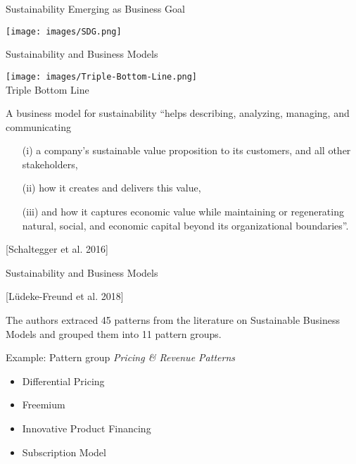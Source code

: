 \documentclass{beamer}
\begin{document}
\begin{frame}{Sustainability Emerging as Business Goal}

\begin{center}
    \texttt{[image: images/SDG.png]}
\end{center}
\end{frame}

\begin{frame}{Sustainability and Business Models}
\begin{center}
  \begin{minipage}{.4\textwidth}\centering
    \texttt{[image: images/Triple-Bottom-Line.png]}\\
    Triple Bottom Line
  \end{minipage}
  \begin{minipage}{.55\textwidth}
    A business model for sustainability “helps describing, analyzing,
    managing, and communicating
  \begin{itemize}
  \item[(i)] a company’s sustainable value proposition to its customers, and
    all other stakeholders,
  \item[(ii)] how it creates and delivers this value,
  \item[(iii)] and how it captures economic value while maintaining or
    regenerating natural, social, and economic capital beyond its
    organizational boundaries”.
  \end{itemize}
  [Schaltegger et al. 2016]
  \end{minipage}
\end{center}
\end{frame}

\begin{frame}{Sustainability and Business Models}

  [Lüdeke-Freund et al. 2018]
  
The authors extraced 45 patterns from the literature on Sustainable Business
Models and grouped them into 11 pattern groups.

Example: Pattern group \emph{Pricing \& Revenue Patterns}
\begin{itemize}
\item Differential Pricing
\item Freemium
\item Innovative Product Financing
\item Subscription Model
\end{itemize}
\end{frame}
\end{document}
